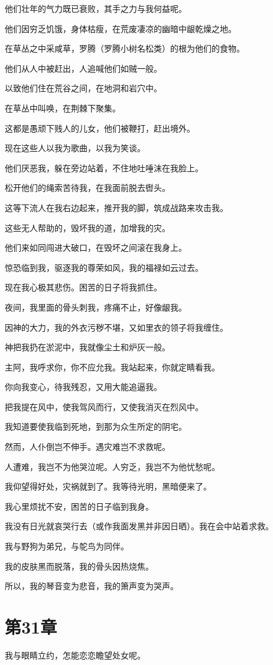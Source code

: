 \documentclass[12pt,oneside]{book}
\begin{document}
他们壮年的气力既已衰败，其手之力与我何益呢。

他们因穷乏饥饿，身体枯瘦，在荒废凄凉的幽暗中龈乾燥之地。

在草丛之中采咸草，罗腾（罗腾小树名松类）的根为他们的食物。

他们从人中被赶出，人追喊他们如贼一般。

以致他们住在荒谷之间，在地洞和岩穴中。

在草丛中叫唤，在荆棘下聚集。

这都是愚顽下贱人的儿女，他们被鞭打，赶出境外。

现在这些人以我为歌曲，以我为笑谈。

他们厌恶我，躲在旁边站着，不住地吐唾沫在我脸上。

松开他们的绳索苦待我，在我面前脱去辔头。

这等下流人在我右边起来，推开我的脚，筑成战路来攻击我。

这些无人帮助的，毁坏我的道，加增我的灾。

他们来如同闯进大破口，在毁坏之间滚在我身上。

惊恐临到我，驱逐我的尊荣如风，我的福禄如云过去。

现在我心极其悲伤。困苦的日子将我抓住。

夜间，我里面的骨头刺我，疼痛不止，好像龈我。

因神的大力，我的外衣污秽不堪，又如里衣的领子将我缠住。

神把我扔在淤泥中，我就像尘土和炉灰一般。

主阿，我呼求你，你不应允我。我站起来，你就定睛看我。

你向我变心，待我残忍，又用大能追逼我。

把我提在风中，使我驾风而行，又使我消灭在烈风中。

我知道要使我临到死地，到那为众生所定的阴宅。

然而，人仆倒岂不伸手。遇灾难岂不求救呢。

人遭难，我岂不为他哭泣呢。人穷乏，我岂不为他忧愁呢。

我仰望得好处，灾祸就到了。我等待光明，黑暗便来了。

我心里烦扰不安，困苦的日子临到我身。

我没有日光就哀哭行去（或作我面发黑并非因日晒）。我在会中站着求救。

我与野狗为弟兄，与鸵鸟为同伴。

我的皮肤黑而脱落，我的骨头因热烧焦。

所以，我的琴音变为悲音，我的箫声变为哭声。


\chapter{第31章}
我与眼睛立约，怎能恋恋瞻望处女呢。
\end{document}
